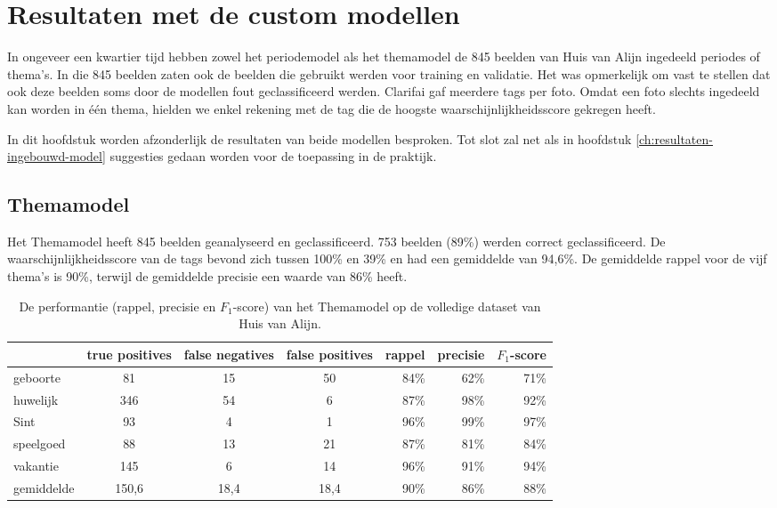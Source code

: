 \chapter{Resultaten met de custom  modellen}
\label{ch:resultaten-custom-model}

In ongeveer een kwartier tijd hebben zowel het periodemodel als het themamodel de 845 beelden van Huis van Alijn ingedeeld periodes of thema’s. In die 845 beelden zaten ook de beelden die gebruikt werden voor training en validatie. Het was opmerkelijk om vast te stellen dat ook deze beelden soms door de modellen fout geclassificeerd werden. Clarifai gaf meerdere tags per foto. Omdat een foto slechts ingedeeld kan worden in één thema, hielden we enkel rekening met de tag die de hoogste waarschijnlijkheidsscore gekregen heeft.

In dit hoofdstuk worden afzonderlijk de resultaten van beide modellen besproken. Tot slot zal net als in hoofdstuk \ref{ch:resultaten-ingebouwd-model} suggesties gedaan worden voor de toepassing in de praktijk.  

\section{Themamodel}
\label{sec:themamodel}

Het Themamodel heeft 845 beelden geanalyseerd en geclassificeerd. 753 beelden (89\%) werden correct geclassificeerd.  De waarschijnlijkheidsscore van de tags bevond zich tussen 100\% en 39\% en had een gemiddelde van 94,6\%. De gemiddelde rappel voor de vijf thema’s is 90\%, terwijl de gemiddelde precisie een waarde van 86\% heeft.

\begin{table}
	\centering
     \renewcommand\arraystretch{1.2}
    \begin{tabular}{l|ccc|rrr}
        \toprule
         & true positives  & false negatives & false positives & rappel & precisie & $F_1$-score \\
        \midrule
        geboorte & 81 & 15 & 50 & 84\% & 62\% & 71\% \\
        huwelijk & 346 & 54 & 6 & 87\% & 98\% & 92\% \\
        Sint & 93 & 4 & 1 & 96\% & 99\% & 97\% \\
        speelgoed & 88 & 13 & 21 & 87\% & 81\% & 84\% \\
        vakantie & 145 & 6 & 14 & 96\% & 91\% & 94\% \\
        \midrule
        gemiddelde & 150,6 & 18,4 & 18,4 & 90\% & 86\% & 88\% \\
        \bottomrule
    \end{tabular}
    \caption{De performantie (rappel, precisie en $F_1$-score) van het Themamodel op de volledige dataset van Huis van Alijn.}
    \label{tab:resultaten-themamodel}
\end{table}

